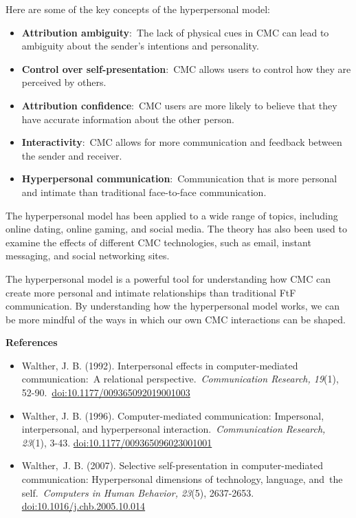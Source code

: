 \documentclass[
]{book}
\begin{document}
Here are some of the key concepts of the hyperpersonal model:

\begin{itemize}
\item
  \textbf{Attribution ambiguity}:~The lack of physical cues in CMC can lead to ambiguity about the sender's intentions and personality.
\item
  \textbf{Control over self-presentation}:~CMC allows users to control how they are perceived by others.
\item
  \textbf{Attribution confidence}:~CMC users are more likely to believe that they have accurate information about the other person.
\item
  \textbf{Interactivity}:~CMC allows for more communication and feedback between the sender and receiver.
\item
  \textbf{Hyperpersonal communication}:~Communication that is more personal and intimate than traditional face-to-face communication.
\end{itemize}

The hyperpersonal model has been applied to a wide range of topics, including online dating, online gaming, and social media. The theory has also been used to examine the effects of different CMC technologies, such as email, instant messaging, and social networking sites.

The hyperpersonal model is a powerful tool for understanding how CMC can create more personal and intimate relationships than traditional FtF communication. By understanding how the hyperpersonal model works, we can be more mindful of the ways in which our own CMC interactions can be shaped.

\textbf{References}

\begin{itemize}
\item
  Walther, J. B. (1992). Interpersonal effects in computer-mediated communication:~A relational perspective.~\emph{Communication Research, 19}(1), 52-90.~\url{doi:10.1177/009365092019001003}
\item
  Walther, J. B. (1996). Computer-mediated communication: Impersonal, interpersonal, and hyperpersonal interaction.~\emph{Communication Research, 23}(1), 3-43. \url{doi:10.1177/009365096023001001}
\item
  Walther,~J. B. (2007). Selective self-presentation in computer-mediated communication: Hyperpersonal dimensions of technology, language, and~the self.~\emph{Computers in Human Behavior, 23}(5), 2637-2653. \url{doi:10.1016/j.chb.2005.10.014}
\end{itemize}
\end{document}
